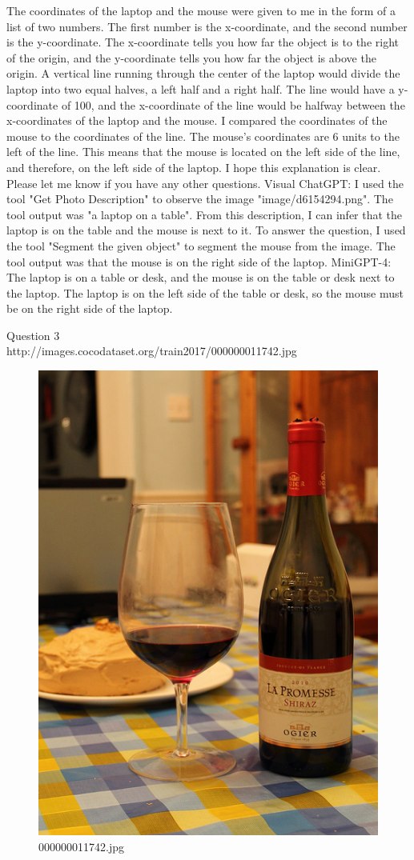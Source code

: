 \begin{enumerate}
        The coordinates of the laptop and the mouse were given to me in the form of a list of two numbers. The first number is the x-coordinate, and the second number is the y-coordinate. The x-coordinate tells you how far the object is to the right of the origin, and the y-coordinate tells you how far the object is above the origin.
        A vertical line running through the center of the laptop would divide the laptop into two equal halves, a left half and a right half. The line would have a y-coordinate of 100, and the x-coordinate of the line would be halfway between the x-coordinates of the laptop and the mouse.
        I compared the coordinates of the mouse to the coordinates of the line. The mouse's coordinates are 6 units to the left of the line. This means that the mouse is located on the left side of the line, and therefore, on the left side of the laptop.
        I hope this explanation is clear. Please let me know if you have any other questions.
        \subitem Visual ChatGPT: I used the tool "Get Photo Description" to observe the image "image/d6154294.png". The tool output was "a laptop on a table". From this description, I can infer that the laptop is on the table and the mouse is next to it. To answer the question, I used the tool "Segment the given object" to segment the mouse from the image. The tool output was that the mouse is on the right side of the laptop.
        \subitem MiniGPT-4: The laptop is on a table or desk, and the mouse is on the table or desk next to the laptop. The laptop is on the left side of the table or desk, so the mouse must be on the right side of the laptop.
    \end{enumerate}
Question 3\\
http://images.cocodataset.org/train2017/000000011742.jpg
    \begin{figure}[h]
        \centering
        \includegraphics[width=0.8\linewidth]{../image set/easy/000000011742.jpg}
        \caption{000000011742.jpg}
    \end{figure}
